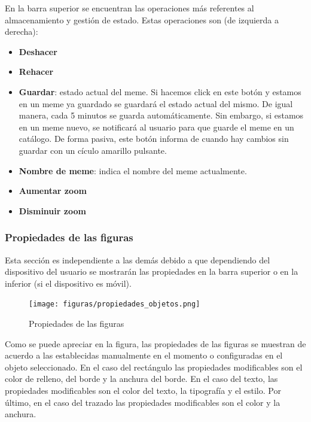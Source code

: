 En la barra superior se encuentran las operaciones más referentes al almacenamiento y gestión de estado. Estas operaciones son (de izquierda a derecha):

\begin{itemize}
    \item \textbf{Deshacer}
    \item \textbf{Rehacer}
    \item \textbf{Guardar}: estado actual del meme. Si hacemos click en este botón y estamos en un meme ya guardado se guardará el estado actual del mismo. De igual manera, cada 5 minutos se guarda automáticamente. Sin embargo, si estamos en un meme nuevo, se notificará al usuario para que guarde el meme en un catálogo. De forma pasiva, este botón informa de cuando hay cambios sin guardar con un cículo amarillo pulsante.
    \item \textbf{Nombre de meme}: indica el nombre del meme actualmente.
    \item \textbf{Aumentar zoom} 
    \item \textbf{Disminuir zoom}
\end{itemize}

\subsubsection{Propiedades de las figuras}

Esta sección es independiente a las demás debido a que dependiendo del dispositivo del usuario se mostrarán las propiedades en la barra superior o en la inferior (si el dispositivo es móvil).

\begin{figure}[H]
    \caption{Propiedades de las figuras}
    \centering
    \vspace*{0.5cm}
    \texttt{[image: figuras/propiedades\_objetos.png]}
\end{figure}

Como se puede apreciar en la figura, las propiedades de las figuras se muestran de acuerdo a las establecidas manualmente en el momento o configuradas en el objeto seleccionado. En el caso del rectángulo las propiedades modificables son el color de relleno, del borde y la anchura del borde. En el caso del texto, las propiedades modificables son el color del texto, la tipografía y el estilo. Por último, en el caso del trazado las propiedades modificables son el color y la anchura.